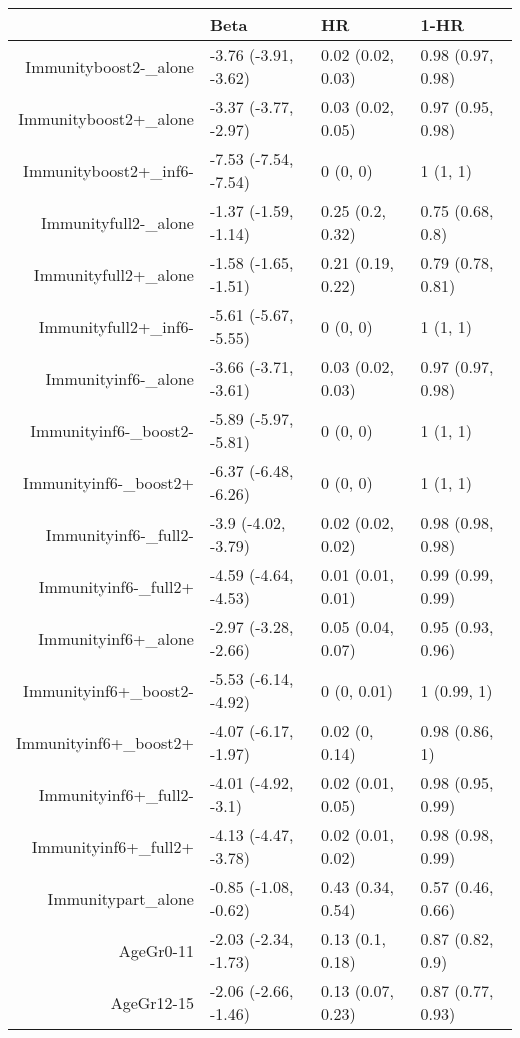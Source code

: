 \begin{table}[ht]
\centering
\begin{tabular}{rlll}
  \hline
 & Beta & HR & 1-HR \\ 
  \hline
Immunityboost2-\_alone & -3.76 (-3.91, -3.62) & 0.02 (0.02, 0.03) & 0.98 (0.97, 0.98) \\ 
  Immunityboost2+\_alone & -3.37 (-3.77, -2.97) & 0.03 (0.02, 0.05) & 0.97 (0.95, 0.98) \\ 
  Immunityboost2+\_inf6- & -7.53 (-7.54, -7.54) & 0 (0, 0) & 1 (1, 1) \\ 
  Immunityfull2-\_alone & -1.37 (-1.59, -1.14) & 0.25 (0.2, 0.32) & 0.75 (0.68, 0.8) \\ 
  Immunityfull2+\_alone & -1.58 (-1.65, -1.51) & 0.21 (0.19, 0.22) & 0.79 (0.78, 0.81) \\ 
  Immunityfull2+\_inf6- & -5.61 (-5.67, -5.55) & 0 (0, 0) & 1 (1, 1) \\ 
  Immunityinf6-\_alone & -3.66 (-3.71, -3.61) & 0.03 (0.02, 0.03) & 0.97 (0.97, 0.98) \\ 
  Immunityinf6-\_boost2- & -5.89 (-5.97, -5.81) & 0 (0, 0) & 1 (1, 1) \\ 
  Immunityinf6-\_boost2+ & -6.37 (-6.48, -6.26) & 0 (0, 0) & 1 (1, 1) \\ 
  Immunityinf6-\_full2- & -3.9 (-4.02, -3.79) & 0.02 (0.02, 0.02) & 0.98 (0.98, 0.98) \\ 
  Immunityinf6-\_full2+ & -4.59 (-4.64, -4.53) & 0.01 (0.01, 0.01) & 0.99 (0.99, 0.99) \\ 
  Immunityinf6+\_alone & -2.97 (-3.28, -2.66) & 0.05 (0.04, 0.07) & 0.95 (0.93, 0.96) \\ 
  Immunityinf6+\_boost2- & -5.53 (-6.14, -4.92) & 0 (0, 0.01) & 1 (0.99, 1) \\ 
  Immunityinf6+\_boost2+ & -4.07 (-6.17, -1.97) & 0.02 (0, 0.14) & 0.98 (0.86, 1) \\ 
  Immunityinf6+\_full2- & -4.01 (-4.92, -3.1) & 0.02 (0.01, 0.05) & 0.98 (0.95, 0.99) \\ 
  Immunityinf6+\_full2+ & -4.13 (-4.47, -3.78) & 0.02 (0.01, 0.02) & 0.98 (0.98, 0.99) \\ 
  Immunitypart\_alone & -0.85 (-1.08, -0.62) & 0.43 (0.34, 0.54) & 0.57 (0.46, 0.66) \\ 
  AgeGr0-11 & -2.03 (-2.34, -1.73) & 0.13 (0.1, 0.18) & 0.87 (0.82, 0.9) \\ 
  AgeGr12-15 & -2.06 (-2.66, -1.46) & 0.13 (0.07, 0.23) & 0.87 (0.77, 0.93) \\ 

\end{tabular}
\end{table}
